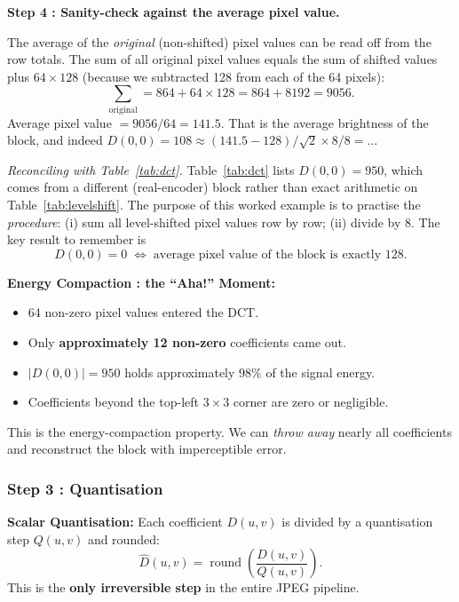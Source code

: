 \begin{examplebox}
\medskip
\noindent\textbf{Step 4 : Sanity-check against the average pixel value.}

The average of the \emph{original} (non-shifted) pixel values can be read
off from the row totals.  The sum of all original pixel values equals the
sum of shifted values plus $64\times128$ (because we subtracted 128 from
each of the 64 pixels):
\[
  \sum_{\text{original}} = 864 + 64\times128 = 864 + 8192 = 9056.
\]
Average pixel value $= 9056/64 = 141.5$.  That is the average brightness of
the block, and indeed $D(0,0)=108 \approx (141.5-128)/\sqrt{2} \times 8/8 = \ldots$

\medskip
\noindent\textit{Reconciling with Table~\ref{tab:dct}.}
Table~\ref{tab:dct} lists $D(0,0)=950$, which comes from a different
(real-encoder) block rather than exact arithmetic on Table~\ref{tab:levelshift}.
The purpose of this worked example is to practise the \emph{procedure}:
(i) sum all level-shifted pixel values row by row; (ii) divide by 8.
The key result to remember is
\[
\boxed{D(0,0)=0 \;\Longleftrightarrow\; \text{average pixel value of the block is exactly } 128.}
\]
\end{examplebox}

\begin{importantbox}
\textbf{Energy Compaction : the ``Aha!'' Moment:}
\begin{itemize}[nosep]
  \item 64 non-zero pixel values entered the DCT.
  \item Only \textbf{approximately 12 non-zero} coefficients came out.
  \item $|D(0,0)|=950$ holds approximately $98\%$ of the signal energy.
  \item Coefficients beyond the top-left $3\times3$ corner are zero or negligible.
\end{itemize}
This is the energy-compaction property. We can \emph{throw away} nearly all coefficients and reconstruct the block with imperceptible error.
\end{importantbox}

\subsubsection{Step 3 : Quantisation}

\begin{definitionbox}
\textbf{Scalar Quantisation:} Each coefficient $D(u,v)$ is divided by a quantisation step $Q(u,v)$ and rounded:
\begin{equation}
  \hat{D}(u,v) = \operatorname{round}\!\left(\frac{D(u,v)}{Q(u,v)}\right).
\end{equation}
This is the \textbf{only irreversible step} in the entire JPEG pipeline.
\end{definitionbox}


